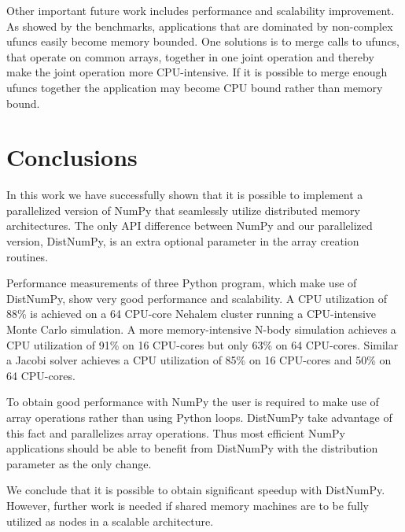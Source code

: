 \documentclass{sigplanconf}
\begin{document}
Other important future work includes performance and scalability improvement. As showed by the benchmarks, applications that are dominated by non-complex ufuncs easily become memory bounded. One solutions is to merge calls to ufuncs, that operate on common arrays, together in one joint operation and thereby make the joint operation more CPU-intensive. If it is possible to merge enough ufuncs together the application may become CPU bound rather than memory bound.

\section{Conclusions}
In this work we have successfully shown that it is possible to implement a parallelized version of NumPy\cite{numpy} that seamlessly utilize distributed memory architectures. The only API difference between NumPy and our parallelized version, DistNumPy, is an extra optional parameter in the array creation routines.

Performance measurements of three Python program, which make use of DistNumPy, show very good performance and scalability. A CPU utilization of 88\% is achieved on a 64 CPU-core Nehalem cluster running a CPU-intensive Monte Carlo simulation. A more memory-intensive N-body simulation achieves a CPU utilization of 91\% on 16 CPU-cores but only 63\% on 64 CPU-cores. Similar a Jacobi solver achieves a CPU utilization of 85\% on 16 CPU-cores and 50\% on 64 CPU-cores.

To obtain good performance with NumPy the user is required to make use of array operations rather than using Python loops. DistNumPy take advantage of this fact and parallelizes array operations. Thus most efficient NumPy applications should be able to benefit from DistNumPy with the distribution parameter as the only change.

We conclude that it is possible to obtain significant speedup with DistNumPy. However, further work is needed if shared memory machines are to be fully utilized as nodes in a scalable architecture.






\end{document}
